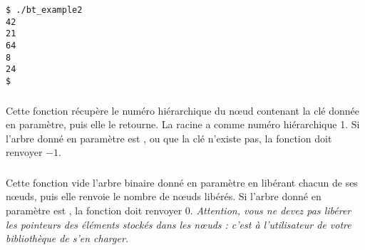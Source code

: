 \begin{table}[ht!]
  \centering
  \begin{minipage}{0.45\textwidth}
    \centering

\lstset{language=sh}
\begin{lstlisting}[frame=single]
$ ./bt_example2
42
21
64
8
24
$
\end{lstlisting}

  \end{minipage}
  \hfillx
  \begin{minipage}{0.45\textwidth}
    \centering


  \end{minipage}
\end{table}

\vspace*{-0.5cm}

\subsubsection*{}

\noindent Cette fonction récupère le numéro hiérarchique du nœud contenant la clé donnée en paramètre, puis elle le retourne.
La racine a comme numéro hiérarchique 1.
Si l'arbre donné en paramètre est , ou que la clé n'existe pas, la fonction doit renvoyer $ -1 $.

\bigskip


\subsubsection*{}

\noindent Cette fonction vide l'arbre binaire donné en paramètre en libérant chacun de ses nœuds, puis elle renvoie le nombre de nœuds libérés.
Si l'arbre donné en paramètre est , la fonction doit renvoyer $ 0 $.
\textit{Attention, vous ne devez pas libérer les pointeurs des éléments stockés dans les nœuds : c'est à l'utilisateur de votre bibliothèque de s'en charger.}
